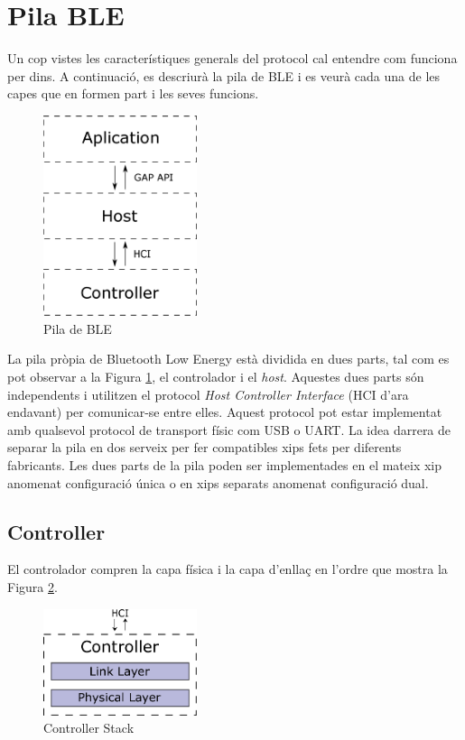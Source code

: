 \section{Pila BLE}
Un cop vistes les característiques generals del protocol cal entendre com funciona per dins.
A continuació, es descriurà la pila de BLE i es veurà cada una de les capes que en formen part i les seves funcions.

\begin{figure}[h!]
	\begin{center}
		\includegraphics[width=0.4\textwidth]{./diagrames/BLE_Stack_Simplified}
		\caption{Pila de BLE}
		\label{ble_stack}
	\end{center}
\end{figure}

La pila pròpia de Bluetooth Low Energy està dividida en dues parts, tal com es pot observar a la Figura \ref{ble_stack}, el controlador i el \textit{host}. Aquestes dues parts són independents i utilitzen el protocol \textit{Host Controller Interface} (HCI d'ara endavant) per comunicar-se entre elles.
Aquest protocol pot estar implementat amb qualsevol protocol de transport físic com USB o UART.
La idea darrera de separar la pila en dos serveix per fer compatibles xips fets per diferents fabricants.
Les dues parts de la pila poden ser implementades en el mateix xip anomenat configuració única o en xips separats anomenat configuració dual.


\subsection{Controller}
El controlador compren la capa física i la capa d'enllaç en l'ordre que mostra la Figura \ref{controller_stack}.

\begin{figure}[h!]
	\begin{center}
		\includegraphics[width=0.4\textwidth]{./diagrames/BLE_Controller}
		\caption{Controller Stack}
		\label{controller_stack}
	\end{center}
\end{figure}

